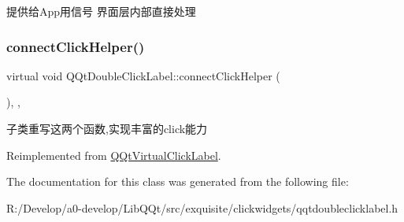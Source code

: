 提供给\+App用信号 界面层内部直接处理 \mbox{\label{class_q_qt_double_click_label_a301dbc204a8cfc64e6714dea1aa0b2d6}} 
\subsubsection{\texorpdfstring{connect\+Click\+Helper()}{connectClickHelper()}}
{\footnotesize\ttfamily virtual void Q\+Qt\+Double\+Click\+Label\+::connect\+Click\+Helper (\begin{DoxyParamCaption}{ }\end{DoxyParamCaption})\hspace{0.3cm}{\ttfamily [inline]}, {\ttfamily [protected]}, {\ttfamily [virtual]}}

子类重写这两个函数,实现丰富的click能力 

Reimplemented from \mbox{\hyperlink{class_q_qt_virtual_click_label_a6e008887a4f2d5287e329a53caf8222c}{Q\+Qt\+Virtual\+Click\+Label}}.



The documentation for this class was generated from the following file\+:\begin{DoxyCompactItemize}
\item 
R\+:/\+Develop/a0-\/develop/\+Lib\+Q\+Qt/src/exquisite/clickwidgets/qqtdoubleclicklabel.\+h\end{DoxyCompactItemize}
